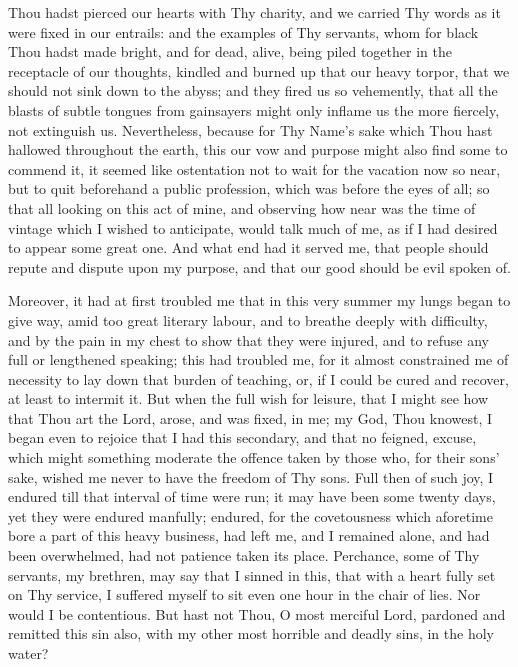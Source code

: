 \documentclass[b5paper,openright,12pt,twoside]{book}
\begin{document}
Thou hadst pierced our hearts with Thy charity, and we carried Thy words
as it were fixed in our entrails: and the examples of Thy servants,
whom for black Thou hadst made bright, and for dead, alive, being piled
together in the receptacle of our thoughts, kindled and burned up that
our heavy torpor, that we should not sink down to the abyss; and they
fired us so vehemently, that all the blasts of subtle tongues from
gainsayers might only inflame us the more fiercely, not extinguish
us. Nevertheless, because for Thy Name's sake which Thou hast hallowed
throughout the earth, this our vow and purpose might also find some to
commend it, it seemed like ostentation not to wait for the vacation now
so near, but to quit beforehand a public profession, which was before
the eyes of all; so that all looking on this act of mine, and observing
how near was the time of vintage which I wished to anticipate, would
talk much of me, as if I had desired to appear some great one. And what
end had it served me, that people should repute and dispute upon my
purpose, and that our good should be evil spoken of.

Moreover, it had at first troubled me that in this very summer my lungs
began to give way, amid too great literary labour, and to breathe deeply
with difficulty, and by the pain in my chest to show that they were
injured, and to refuse any full or lengthened speaking; this had
troubled me, for it almost constrained me of necessity to lay down that
burden of teaching, or, if I could be cured and recover, at least to
intermit it. But when the full wish for leisure, that I might see
how that Thou art the Lord, arose, and was fixed, in me; my God, Thou
knowest, I began even to rejoice that I had this secondary, and that
no feigned, excuse, which might something moderate the offence taken by
those who, for their sons' sake, wished me never to have the freedom of
Thy sons. Full then of such joy, I endured till that interval of time
were run; it may have been some twenty days, yet they were endured
manfully; endured, for the covetousness which aforetime bore a part of
this heavy business, had left me, and I remained alone, and had been
overwhelmed, had not patience taken its place. Perchance, some of Thy
servants, my brethren, may say that I sinned in this, that with a heart
fully set on Thy service, I suffered myself to sit even one hour in the
chair of lies. Nor would I be contentious. But hast not Thou, O most
merciful Lord, pardoned and remitted this sin also, with my other most
horrible and deadly sins, in the holy water?
\end{document}

